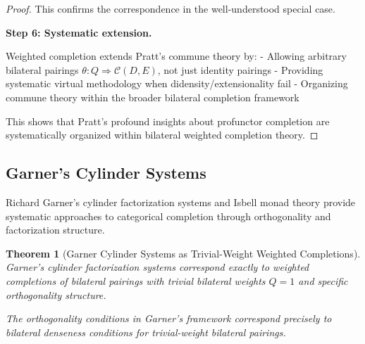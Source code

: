 \documentclass[11pt]{article}
\theoremstyle{plain}
\newtheorem{theorem}{Theorem}[section]
\theoremstyle{definition}
\theoremstyle{remark}
\begin{document}
\begin{proof}
This confirms the correspondence in the well-understood special case.

\textbf{Step 6: Systematic extension.}

Weighted completion extends Pratt's commune theory by:
- Allowing arbitrary bilateral pairings $\theta : Q \Rightarrow \mathcal{C}(D, E)$, not just identity pairings
- Providing systematic virtual methodology when didensity/extensionality fail
- Organizing commune theory within the broader bilateral completion framework

This shows that Pratt's profound insights about profunctor completion are systematically organized within bilateral weighted completion theory.
\end{proof}

\subsection{Garner's Cylinder Systems}

Richard Garner's cylinder factorization systems \cite{garner2018cylinder} and Isbell monad theory provide systematic approaches to categorical completion through orthogonality and factorization structure.

\begin{theorem}[Garner Cylinder Systems as Trivial-Weight Weighted Completions]\label{thm:garner-cylinder-correspondence}
Garner's cylinder factorization systems correspond exactly to weighted completions of bilateral pairings with trivial bilateral weights $Q = 1$ and specific orthogonality structure.

The orthogonality conditions in Garner's framework correspond precisely to bilateral denseness conditions for trivial-weight bilateral pairings.
\end{theorem}
\end{document}
